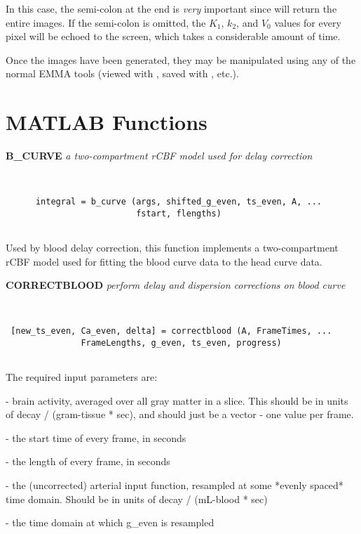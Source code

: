 In this case, the semi-colon at the end is {\em very} important since
 will return the entire images.  If the semi-colon is
omitted, the $K_1$, $k_2$, and $V_0$ values for every pixel will be
echoed to the screen, which takes a considerable amount of time.

Once the images have been generated, they may be manipulated using
any of the normal EMMA tools (viewed with , saved
with , etc.).


\newpage
\section{MATLAB Functions}

{\large\bf B\_CURVE} {\em a two-compartment rCBF model used for delay
correction}
\begin{verbatim}


      integral = b_curve (args, shifted_g_even, ts_even, A, ... 
                          fstart, flengths)


\end{verbatim}

  Used by blood delay correction, this function implements a
  two-compartment rCBF model used for fitting the blood
  curve data to the head curve data.
\newpage


{\large\bf CORRECTBLOOD} {\em  perform delay and dispersion corrections on blood curve}
\begin{verbatim}


 [new_ts_even, Ca_even, delta] = correctblood (A, FrameTimes, ...
               FrameLengths, g_even, ts_even, progress)


\end{verbatim}

   The required input parameters are: 
\begin{description}
\item {} - brain activity, averaged over all gray matter in a slice.  This
           should be in units of decay / (gram-tissue * sec), and should
           just be a vector - one value per frame.
\item {} - the start time of every frame, in seconds
\item {} - the length of every frame, in seconds
\item {} - the (uncorrected) arterial input function, resampled at
                some *evenly spaced* time domain.  Should be in units
                of decay / (mL-blood * sec)
\item {} - the time domain at which g\_even is resampled
\end{description}
 
